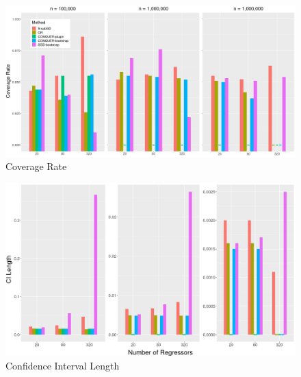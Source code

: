 \documentclass[beamer, t]{beamer}
\begin{document}
\begin{frame}
	
	\begin{figure}[!htbp]
		\caption{Coverage Rate} \label{fig:ci}
		\centering
		\vskip10pt
		\includegraphics[width=\textwidth]{fig_coverage.png}
	\end{figure}
	
\end{frame}


\begin{frame}
	
	\begin{figure}[!htbp]
		\caption{Confidence Interval Length} \label{fig:ci}
		\centering
		\vskip10pt
			\includegraphics[width=\textwidth]{fig_ci_length.png}
	\end{figure}
	
\end{frame}
\end{document}
